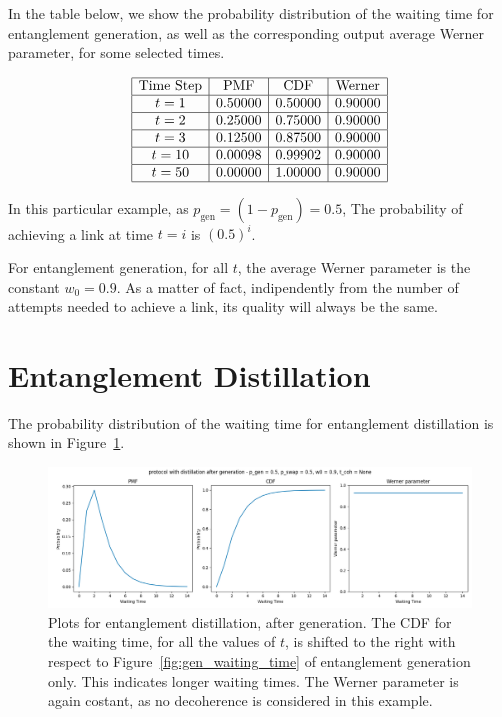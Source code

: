 \documentclass{masterthesis}
\begin{document}
In the table below, we show the probability distribution of the waiting time for entanglement generation, as well as the corresponding output average Werner parameter, for some selected times.

\begin{equation*}
    \begin{array}{|c|c|c|c|}
        \hline
        \text{Time Step} & \text{PMF} & \text{CDF} & \text{Werner} \\
        \hline
        t = 1 & 0.50000 & 0.50000 & 0.90000 \\
        \hline
        t = 2 & 0.25000 & 0.75000 & 0.90000 \\
        \hline
        t = 3 & 0.12500 & 0.87500 & 0.90000 \\
        \hline
        t = 10 & 0.00098 & 0.99902 & 0.90000 \\
        \hline
        t = 50 & 0.00000 & 1.00000 & 0.90000 \\
        \hline
    \end{array}
    \label{tab:gen_waiting_time}
\end{equation*}

In this particular example, as $p_\text{gen} = (1 - p_\text{gen}) = 0.5$, The probability of achieving a link at time $t = i$ is $(0.5)^i$.

For entanglement generation, for all $t$, the average Werner parameter is the constant $w_0 = 0.9$. As a matter of fact, indipendently from the number of attempts needed to achieve a link, its quality will always be the same.

\section{Entanglement Distillation}

The probability distribution of the waiting time for entanglement distillation is shown in Figure~\ref{fig:dist_waiting_time}.

\begin{figure}[ht]
    \centering
    \includegraphics[width=1\linewidth]{images/dist_tests/distillation after generation.png}
    \caption{Plots for entanglement distillation, after generation. The CDF for the waiting time, for all the values of $t$, is shifted to the right with respect to Figure~\ref{fig:gen_waiting_time} of entanglement generation only. This indicates longer waiting times. The Werner parameter is again costant, as no decoherence is considered in this example.}
    \label{fig:dist_waiting_time}
\end{figure}
\end{document}
